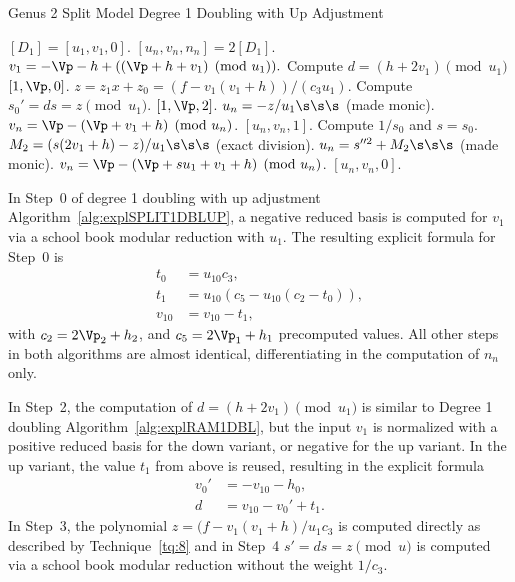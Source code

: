 \begin{algorithm}[htbp]
\caption{Genus 2 Split Model Degree 1 Doubling with Up Adjustment\label{alg:explSPLIT1DBLUP}}
\begin{algorithmic} [1]
\Require $[D_1] = [u_1,v_1, 0]$.  \smallskip
\Ensure $[u_n,v_n,n_n] = 2[D_1]$.
\algrule
\setcounter{ALG@line}{-1}
\State $v_1 = -\Vp - h + ((\Vp + h + v_1) \pmod{u_1}).$ 
\State Compute $d = (h + 2v_1) \pmod{u_1}$
 \Return $[1,\Vp,0]$.
\EndIf
\State $z = z_1x + z_0 = (f- v_1(v_1 + h))/(c_3u_1).$
\State Compute $s_0' = ds =  z \pmod{u_1}$.
     \Return $[1,\Vp,2]$.
    \EndIf
    \State $u_n = -z/u_1\s\s\s$ (made monic).
    \State $v_n = \Vp - (\Vp + v_1 + h) \pmod{u_n}$.
    \State \Return $[u_n,v_n,1]$.
\EndIf
\State Compute $1/s_0$ and $s = s_0$.
\State $M_2 = (s(2v_1 + h) - z)/u_1 \s\s\s$ (exact division).
\State $u_n = s^{\prime \prime 2} + M_2 \s\s\s$ (made monic).
\State $v_n = \Vp - (\Vp + su_1 + v_1 + h) \pmod{u_n}$.
\State \Return $[u_n,v_n,0]$.
\end{algorithmic}
\end{algorithm}

In Step~0 of degree 1 doubling with up adjustment
Algorithm~\ref{alg:explSPLIT1DBLUP}, a negative reduced basis is computed for
$v_1$ via a school book modular reduction with $u_1$. The resulting explicit formula for
Step~0 is 
\begin{align*}
    t_0 &= u_{10}c_3,\\
    t_1 &= u_{10}(c_5 - u_{10}(c_2 - t_0)),\\
    v_{10} &= v_{10} - t_1,
\end{align*} with $c_2 = 2\Vp_2 + h_2$, and $c_5 = 2\Vp_1 + h_1$ 
precomputed values.  All other steps in both algorithms are almost identical,
differentiating in the computation of $n_n$ only.

In Step~2, the computation of $d = (h + 2v_1) \pmod{u_1}$ is similar to Degree 1 doubling
Algorithm~\ref{alg:explRAM1DBL}, but the input $v_1$ is normalized with a
positive reduced basis for the down variant, or negative for the up variant. In
the up variant, the value $t_1$ from above is reused, resulting in
the explicit formula
\begin{align*}
    v_0' &= -v_{10} - h_0,\\
    d    &= v_{10} - v_0' + t_1.
\end{align*}
In Step~3, the polynomial $z = (f - v_1(v_1 + h)/u_1c_3$ is computed directly as
described by Technique~\ref{tq:8} and in Step~4 $s'= ds = z \pmod{u}$ is
computed via a school book modular reduction without the weight  $1/c_3$. 

